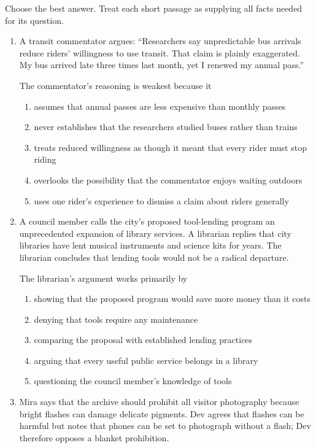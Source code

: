 Choose the best answer. Treat each short passage as supplying all facts needed for its question.

\begin{enumerate}
\item A transit commentator argues: ``Researchers say unpredictable bus arrivals reduce riders' willingness to use transit. That claim is plainly exaggerated. My bus arrived late three times last month, yet I renewed my annual pass.''

The commentator's reasoning is weakest because it
\begin{enumerate}
\item assumes that annual passes are less expensive than monthly passes
\item never establishes that the researchers studied buses rather than trains
\item treats reduced willingness as though it meant that every rider must stop riding
\item overlooks the possibility that the commentator enjoys waiting outdoors
\item uses one rider's experience to dismiss a claim about riders generally
\end{enumerate}

\item A council member calls the city's proposed tool-lending program an unprecedented expansion of library services. A librarian replies that city libraries have lent musical instruments and science kits for years. The librarian concludes that lending tools would not be a radical departure.

The librarian's argument works primarily by
\begin{enumerate}
\item showing that the proposed program would save more money than it costs
\item denying that tools require any maintenance
\item comparing the proposal with established lending practices
\item arguing that every useful public service belongs in a library
\item questioning the council member's knowledge of tools
\end{enumerate}

\item Mira says that the archive should prohibit all visitor photography because bright flashes can damage delicate pigments. Dev agrees that flashes can be harmful but notes that phones can be set to photograph without a flash; Dev therefore opposes a blanket prohibition.


\end{enumerate}
